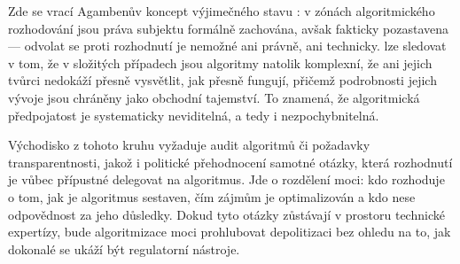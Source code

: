 Zde se vrací Agambenův koncept výjimečného stavu \parencite{Agamben05}: v zónách algoritmického rozhodování jsou práva subjektu formálně zachována, avšak fakticky pozastavena — odvolat se proti rozhodnutí  je nemožné ani právně, ani technicky.
 lze sledovat v tom, že v složitých případech jsou algoritmy natolik komplexní, že ani jejich tvůrci nedokáží přesně vysvětlit, jak přesně fungují, přičemž podrobnosti jejich vývoje jsou chráněny jako obchodní tajemství. To znamená, že algoritmická předpojatost je systematicky neviditelná, a tedy i nezpochybnitelná.

Východisko z tohoto kruhu vyžaduje audit algoritmů či požadavky transparentnosti, jakož i politické přehodnocení samotné otázky, která rozhodnutí je vůbec přípustné delegovat na algoritmus. Jde o rozdělení moci: kdo rozhoduje o tom, jak je algoritmus sestaven, čím zájmům je optimalizován a kdo nese odpovědnost za jeho důsledky. Dokud tyto otázky zůstávají v prostoru technické expertízy, bude algoritmizace moci prohlubovat depolitizaci bez ohledu na to, jak dokonalé se ukáží být regulatorní nástroje.
